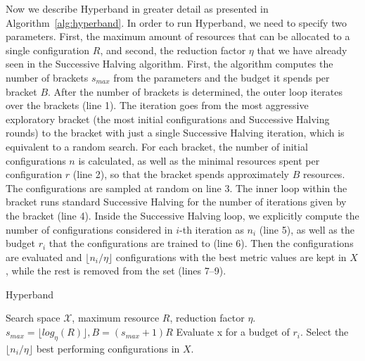 Now we describe Hyperband in greater detail as presented in Algorithm~\ref{alg:hyperband}. In order to run Hyperband, we need to specify two parameters. First, the maximum amount of resources that can be allocated to a single configuration $R$, and second, the reduction factor $\eta$ that we have already seen in the Successive Halving algorithm. First, the algorithm computes the number of brackets $s_{max}$ from the parameters and the budget it spends per bracket $B$. After the number of brackets is determined, the outer loop iterates over the brackets (line 1). The iteration goes from the most aggressive exploratory bracket (the most initial configurations and Successive Halving rounds) to the bracket with just a single Successive Halving iteration, which is equivalent to a random search. For each bracket, the number of initial configurations $n$ is calculated, as well as the minimal resources spent per configuration $r$ (line 2), so that the bracket spends approximately $B$ resources. The configurations are sampled at random on line 3. The inner loop within the bracket runs standard Successive Halving for the number of iterations given by the bracket (line 4). Inside the Successive Halving loop, we explicitly compute the number of configurations considered in $i$-th iteration as $n_i$ (line 5), as well as the budget $r_i$ that the configurations are trained to (line 6). Then the configurations are evaluated and $ \lfloor n_i/\eta \rfloor$ configurations with the best metric values are kept in $X$, while the rest is removed from the set (lines 7--9).

\begin{algorithm}
    \caption{Hyperband}
    \begin{algorithmic}[1]
     Search space $\mathcal{X}$,\hspace{1mm} maximum resource $R$,\hspace{1mm} reduction factor $\eta$.
     $s_{max} = \lfloor log_\eta (R) \rfloor , B=(s_{max}+1)R$
                \State Evaluate x for a budget of $r_i$.
            \EndFor
        \State Select the $\lfloor n_i/\eta \rfloor $ best performing configurations in $X$.
        \EndFor
    \EndFor
    \State {}
    \end{algorithmic}
    \label{alg:hyperband}
\end{algorithm}

